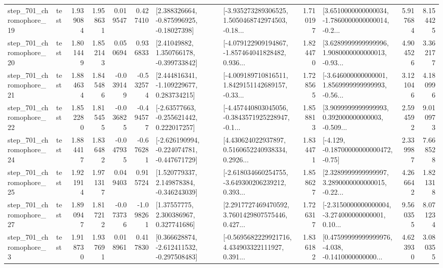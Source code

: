 \begin{tabular}{llrrrrllrlrr}
  step\_701\_chromophore\_19 &      test &      1.939084 &    1.958631 &      0.019547 &  0.427410 &    [2.388326664, -0.875996925, -0.18027398] &  [-3.935273289306525, 1.5050468742974503, -0.18... &       1.710197 &  [3.6510000000000034, -1.7860000000000014, -0.2... &            5.917684 &          8.154425 \\
  step\_701\_chromophore\_20 &      test &      1.801449 &    1.852143 &      0.050694 &  0.936833 &     [2.41049882, 1.350766178, -0.399733842] &  [-4.079122909194867, -1.857464041828482, 0.936... &       1.824470 &  [3.6289999999999996, 1.9080000000000013, -0.93... &            4.904526 &          3.362177 \\
  step\_701\_chromophore\_21 &      test &      1.884634 &    1.845486 &     -0.039149 & -0.532574 &    [2.444816341, -1.109229677, 0.283734215] &  [-4.009189710816511, 1.8429151142689157, -0.33... &       1.728565 &  [-3.646000000000001, 1.8569999999999993, -0.56... &            3.121046 &          4.180996 \\
  step\_701\_chromophore\_22 &      test &      1.852280 &    1.815455 &     -0.036825 & -0.494577 &    [-2.63577663, -0.255621442, 0.222017257] &  [-4.457440803045056, -0.3843571925228947, -0.1... &       1.858813 &  [3.9099999999999993, 0.392000000000003, -0.509... &            2.594592 &          9.010973 \\
  step\_701\_chromophore\_24 &      test &      1.884417 &    1.836482 &     -0.047935 & -0.676281 &  [-2.626190994, -0.224074781, -0.447671729] &  [4.430624022937897, 0.5160652240938334, 0.2926... &       1.834471 &              [-4.129, -0.18700000000000472, -0.75] &            2.339987 &          7.668528 \\
  step\_701\_chromophore\_25 &      test &      1.921914 &    1.971317 &      0.049403 &  0.915724 &    [1.520779337, 2.149878384, -0.346243039] &  [-2.618034660254755, -3.649300206239212, 0.393... &       1.858627 &  [2.3289999999999997, 3.2890000000000015, -0.22... &            4.266642 &          1.821318 \\
  step\_701\_chromophore\_27 &      test &      1.890947 &    1.817212 &     -0.073736 & -1.098261 &      [1.37557775, 2.300386967, 0.327741686] &  [2.2917727469470592, 3.7601429807575446, 0.427... &       1.726317 &  [-2.3150000000000004, -3.274000000000001, 0.10... &            9.560355 &          8.071234 \\
   step\_701\_chromophore\_3 &      test &      1.918730 &    1.937691 &      0.018961 &  0.417830 &   [0.366628874, -2.612411532, -0.297508483] &  [-0.5695682229921716, 4.434903322111927, 0.391... &       1.836182 &  [0.47599999999999976, -4.038, -0.1410000000000... &            4.623930 &          3.080355 \\

\end{tabular}
